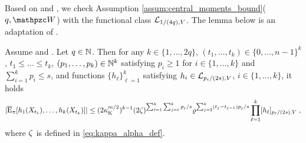 Based on  and , we check Assumption \cref{assum:central_moments_bound}($q,\lyapW$) with the functional class $\mathcal L_{1/(4q),V}$. The lemma below is an adaptation of .
\begin{lemma}
\label{lem:centered_moments_Wasserstein_new}
Assume  and . Let $q \in \mathbb{N}$. Then for any $k \in \{1,\ldots,2q\}$,  $(t_1,\dots,t_{k}) \in \{0,\ldots,n-1\}^{k}$, $t_1 \leq \dots\leq t_{k}$,   $(p_1,\dots,p_k) \in \mathbb{N}^k$ satisfying  $p_i \geq 1$ for $i \in \{1,\dots,k\}$ and $\sum_{i=1}^k p_i \leq s$, and functions $\{h_{\ell}\}_{\ell=1}^{k}$ satisfying  $h_{i} \in  \mathcal L_{p_i/(2s), V}$, $i \in \{1,\dots,k\}$, it holds
\begin{equation}
\label{eq:centred_moments_wasserstein_first_bound}
|\PEC_\pi[h_1(X_{t_1}), \ldots, h_k(X_{t_k})] |
\leq (2 \boundmetric^{m/2})^{k-1}  (2\constlemqnpi)^{\sum_{\ell=1}^k\sum_{j=\ell}^k p_{j}/s}
\ratewas^{\sum_{j=2}^{k}(t_j - t_{j-1})p_{j}/s} \prod_{\ell = 1}^k \Nnorm[p_{\ell}/(2s), V]{h_{\ell}} \eqsp,
\end{equation}
where $\zeta$ is defined in \eqref{eq:kappa_alpha_def}.
\end{lemma}
